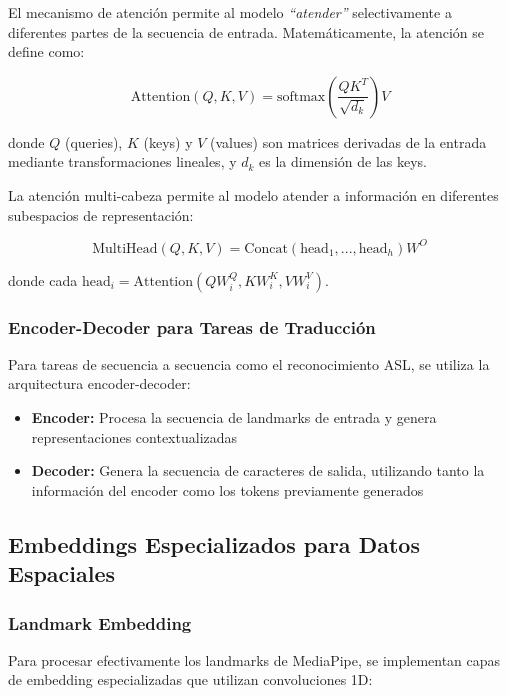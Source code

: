 \documentclass[12pt,a4paper]{article}
\begin{document}
El mecanismo de atención permite al modelo \textit{``atender''} selectivamente a diferentes partes de la secuencia de entrada. Matemáticamente, la atención se define como:

\begin{equation}
\text{Attention}(Q, K, V) = \text{softmax}\left(\frac{QK^T}{\sqrt{d_k}}\right)V
\end{equation}

donde $Q$ (queries), $K$ (keys) y $V$ (values) son matrices derivadas de la entrada mediante transformaciones lineales, y $d_k$ es la dimensión de las keys.

La atención multi-cabeza permite al modelo atender a información en diferentes subespacios de representación:

\begin{equation}
\text{MultiHead}(Q, K, V) = \text{Concat}(\text{head}_1, ..., \text{head}_h)W^O
\end{equation}

donde cada $\text{head}_i = \text{Attention}(QW_i^Q, KW_i^K, VW_i^V)$.

\subsubsection{Encoder-Decoder para Tareas de Traducción}

Para tareas de secuencia a secuencia como el reconocimiento ASL, se utiliza la arquitectura encoder-decoder:

\begin{itemize}
    \item \textbf{Encoder:} Procesa la secuencia de landmarks de entrada y genera representaciones contextualizadas
    \item \textbf{Decoder:} Genera la secuencia de caracteres de salida, utilizando tanto la información del encoder como los tokens previamente generados
\end{itemize}

\subsection{Embeddings Especializados para Datos Espaciales}

\subsubsection{Landmark Embedding}

Para procesar efectivamente los landmarks de MediaPipe, se implementan capas de embedding especializadas que utilizan convoluciones 1D:
\end{document}
